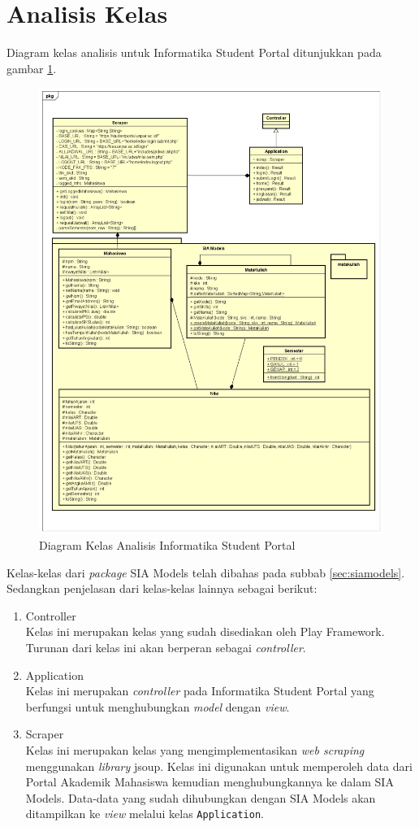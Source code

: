 \section{Analisis Kelas}
Diagram kelas analisis untuk Informatika Student Portal ditunjukkan pada gambar \ref{fig:3_class_diagram}.
	\begin{figure}[H]
			\centering
			\includegraphics[scale=0.5]{Gambar/class-diagram}
			\caption{Diagram Kelas Analisis Informatika Student Portal} 
			\label{fig:3_class_diagram}
		\end{figure}
Kelas-kelas dari \textit{package} SIA Models telah dibahas pada subbab \ref{sec:siamodels}. Sedangkan penjelasan dari kelas-kelas lainnya sebagai berikut:
\begin{enumerate}
	\item Controller\\
	Kelas ini merupakan kelas yang sudah disediakan oleh Play Framework. Turunan dari kelas ini akan berperan sebagai \textit{controller}.
	\item Application\\
	Kelas ini merupakan \textit{controller} pada Informatika Student Portal yang berfungsi untuk menghubungkan \textit{model} dengan \textit{view}. 
	\item Scraper\\
	Kelas ini merupakan kelas yang mengimplementasikan \textit{web scraping} menggunakan \textit{library} jsoup. Kelas ini digunakan untuk memperoleh data dari Portal Akademik Mahasiswa kemudian menghubungkannya ke dalam SIA Models. Data-data yang sudah dihubungkan dengan SIA Models akan ditampilkan ke \textit{view} melalui kelas \texttt{Application}.
\end{enumerate}
		